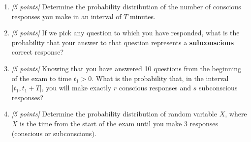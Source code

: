 \documentclass[article,12pt,a4paper]{article}
\newcounter{num}  %
\begin{document}
		\begin{enumerate}
			\item \textit{[5 points]} Determine the probability distribution of the number of conscious responses you make in an interval of \( T \) minutes.
			
			\vspace{6cm}
			
			\item \textit{[5 points]} If we pick any question to which you have responded, what is the probability that your answer to that question represents a \textbf{subconscious} correct response?
				
				\vspace{14cm}
				
			
			\item \textit{[5 points]} Knowing that you have answered 10 questions from the beginning of the exam to time $t_1>0$. What is the probability that, in the interval $]t_1,t_1+T]$, you will make exactly \( r \) conscious responses and \( s \) subconscious responses?
			
			\vspace{12cm}
			
			
			\item \textit{[5 points]} Determine the probability distribution of random variable \( X \), where \( X \) is the time from the start of the exam until you make 3 responses (conscious or subconscious).
			
			\vspace{12cm}
			
			
			
			
			
			
		\end{enumerate}
	
	
	\newpage
	
\end{document}
